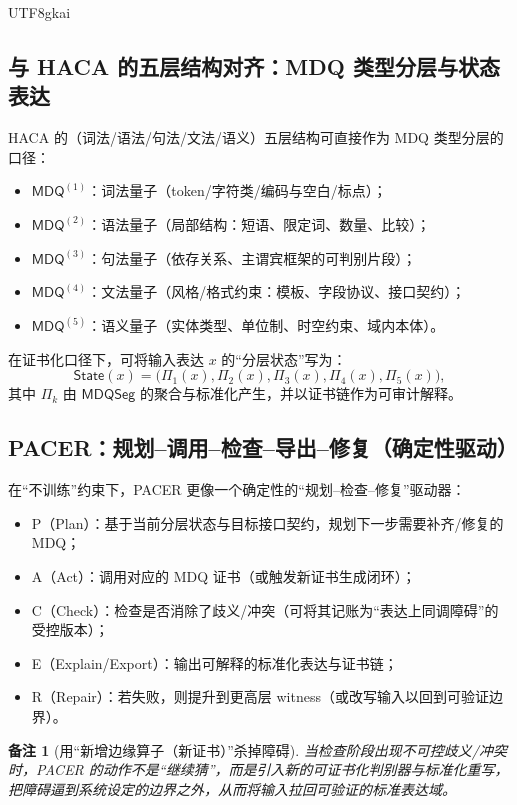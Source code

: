 \documentclass[12pt]{article}
\newtheorem{remark}{备注}[section]
\begin{document}
\begin{CJK*}{UTF8}{gkai}
\subsection{与 HACA 的五层结构对齐：MDQ 类型分层与状态表达}
\label{subsec:align-haca}

HACA 的（词法/语法/句法/文法/语义）五层结构可直接作为 MDQ 类型分层的口径：
\begin{itemize}
  \item $\mathsf{MDQ}^{(1)}$：词法量子（token/字符类/编码与空白/标点）；
  \item $\mathsf{MDQ}^{(2)}$：语法量子（局部结构：短语、限定词、数量、比较）；
  \item $\mathsf{MDQ}^{(3)}$：句法量子（依存关系、主谓宾框架的可判别片段）；
  \item $\mathsf{MDQ}^{(4)}$：文法量子（风格/格式约束：模板、字段协议、接口契约）；
  \item $\mathsf{MDQ}^{(5)}$：语义量子（实体类型、单位制、时空约束、域内本体）。
\end{itemize}

在证书化口径下，可将输入表达 $x$ 的“分层状态”写为：
\[
\mathsf{State}(x)=\bigl(\Pi_1(x),\Pi_2(x),\Pi_3(x),\Pi_4(x),\Pi_5(x)\bigr),
\]
其中 $\Pi_k$ 由 $\mathsf{MDQSeg}$ 的聚合与标准化产生，并以证书链作为可审计解释。

\subsection{PACER：规划--调用--检查--导出--修复（确定性驱动）}
\label{subsec:pacer}

在“不训练”约束下，PACER 更像一个确定性的“规划--检查--修复”驱动器：
\begin{itemize}
  \item P（Plan）：基于当前分层状态与目标接口契约，规划下一步需要补齐/修复的 MDQ；
  \item A（Act）：调用对应的 MDQ 证书（或触发新证书生成闭环）；
  \item C（Check）：检查是否消除了歧义/冲突（可将其记账为“表达上同调障碍”的受控版本）；
  \item E（Explain/Export）：输出可解释的标准化表达与证书链；
  \item R（Repair）：若失败，则提升到更高层 witness（或改写输入以回到可验证边界）。
\end{itemize}

\begin{remark}[用“新增边缘算子（新证书）”杀掉障碍]
当检查阶段出现不可控歧义/冲突时，PACER 的动作不是“继续猜”，而是引入新的可证书化判别器与标准化重写，
把障碍逼到系统设定的边界之外，从而将输入拉回可验证的标准表达域。
\end{remark}


\end{CJK*}
\end{document}
